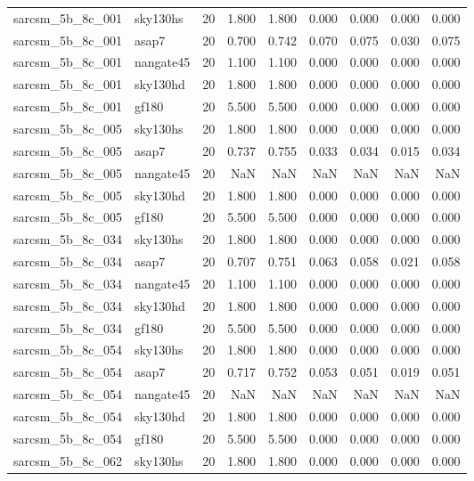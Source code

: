 \begin{tabular}{llrrrrrrr}
sarcsm\_5b\_8c\_001 & sky130hs & 20 & 1.800 & 1.800 & 0.000 & 0.000 & 0.000 & 0.000 \\
sarcsm\_5b\_8c\_001 & asap7 & 20 & 0.700 & 0.742 & 0.070 & 0.075 & 0.030 & 0.075 \\
sarcsm\_5b\_8c\_001 & nangate45 & 20 & 1.100 & 1.100 & 0.000 & 0.000 & 0.000 & 0.000 \\
sarcsm\_5b\_8c\_001 & sky130hd & 20 & 1.800 & 1.800 & 0.000 & 0.000 & 0.000 & 0.000 \\
sarcsm\_5b\_8c\_001 & gf180 & 20 & 5.500 & 5.500 & 0.000 & 0.000 & 0.000 & 0.000 \\
sarcsm\_5b\_8c\_005 & sky130hs & 20 & 1.800 & 1.800 & 0.000 & 0.000 & 0.000 & 0.000 \\
sarcsm\_5b\_8c\_005 & asap7 & 20 & 0.737 & 0.755 & 0.033 & 0.034 & 0.015 & 0.034 \\
sarcsm\_5b\_8c\_005 & nangate45 & 20 & NaN & NaN & NaN & NaN & NaN & NaN \\
sarcsm\_5b\_8c\_005 & sky130hd & 20 & 1.800 & 1.800 & 0.000 & 0.000 & 0.000 & 0.000 \\
sarcsm\_5b\_8c\_005 & gf180 & 20 & 5.500 & 5.500 & 0.000 & 0.000 & 0.000 & 0.000 \\
sarcsm\_5b\_8c\_034 & sky130hs & 20 & 1.800 & 1.800 & 0.000 & 0.000 & 0.000 & 0.000 \\
sarcsm\_5b\_8c\_034 & asap7 & 20 & 0.707 & 0.751 & 0.063 & 0.058 & 0.021 & 0.058 \\
sarcsm\_5b\_8c\_034 & nangate45 & 20 & 1.100 & 1.100 & 0.000 & 0.000 & 0.000 & 0.000 \\
sarcsm\_5b\_8c\_034 & sky130hd & 20 & 1.800 & 1.800 & 0.000 & 0.000 & 0.000 & 0.000 \\
sarcsm\_5b\_8c\_034 & gf180 & 20 & 5.500 & 5.500 & 0.000 & 0.000 & 0.000 & 0.000 \\
sarcsm\_5b\_8c\_054 & sky130hs & 20 & 1.800 & 1.800 & 0.000 & 0.000 & 0.000 & 0.000 \\
sarcsm\_5b\_8c\_054 & asap7 & 20 & 0.717 & 0.752 & 0.053 & 0.051 & 0.019 & 0.051 \\
sarcsm\_5b\_8c\_054 & nangate45 & 20 & NaN & NaN & NaN & NaN & NaN & NaN \\
sarcsm\_5b\_8c\_054 & sky130hd & 20 & 1.800 & 1.800 & 0.000 & 0.000 & 0.000 & 0.000 \\
sarcsm\_5b\_8c\_054 & gf180 & 20 & 5.500 & 5.500 & 0.000 & 0.000 & 0.000 & 0.000 \\
sarcsm\_5b\_8c\_062 & sky130hs & 20 & 1.800 & 1.800 & 0.000 & 0.000 & 0.000 & 0.000 \\

\end{tabular}
